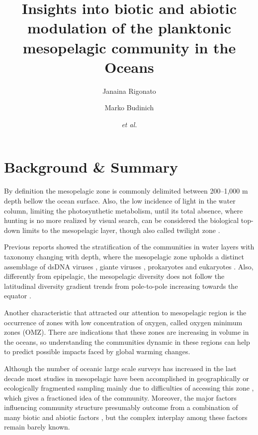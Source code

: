 \documentclass[fleqn,10pt]{wlscirep}
\title{Insights into biotic and abiotic modulation of the planktonic mesopelagic community in the Oceans}
\author[1,$\dag$]{Janaina Rigonato}
\author[2,$\dag$]{Marko Budinich}
\author[1,2]{\textit{et al.}}
\affil[$\dag$]{these authors contributed equally to this work}
\begin{document}
\flushbottom
\maketitle

\thispagestyle{empty}



\section*{Background \& Summary}

By definition the mesopelagic zone is commonly delimited between 200–1,000 m depth bellow the ocean surface. Also, the low incidence of light in the water column, limiting the photosynthetic metabolism, until its total absence, where hunting is no more realized by visual search, can be considered the biological top-down limits to the mesopelagic layer, though also called twilight zone \cite{robinson_mesopelagic_2010}.

Previous reports showed the stratification of the communities in water layers with taxonomy changing with depth, where the mesopelagic zone upholds a distinct assemblage  of dsDNA viruses \cite{gregory_marine_2019}, giante viruses \cite{endo_biogeography_2020}, prokaryotes \cite{sunagawa_structure_2015,salazar_gene_2019} and eukaryotes \cite{giner_marked_2020}. Also, differently from epipelagic, the mesopelagic diversity does not follow the latitudinal diversity gradient trends from pole-to-pole increasing towards the equator \cite{ibarbalz_global_2019}.

Another characteristic that attracted our attention to mesopelagic region is the occurrence of zones with low concentration of oxygen, called oxygen minimum zones (OMZ). There are indications that these zones are increasing in volume in the oceans, so understanding the communities dynamic in these regions can help to predict possible impacts faced by global warming changes.

Although the number of oceanic large scale surveys has increased in the last decade \cite{rusch_sorcerer_2007,karsenti_holistic_2011,pernice_global_2015} most studies in mesopelagic have been accomplished in geographically or ecologically fragmented sampling mainly due to difficulties of accessing this zone \cite{hidalgo_developing_2019}, which gives a fractioned idea of the community. Moreover, the major factors influencing community structure presumably outcome from a combination of many biotic and abiotic factors \cite{lima-mendez_determinants_2015, louca_integrating_2016}, but the complex interplay among these factors remain barely known.
\end{document}

